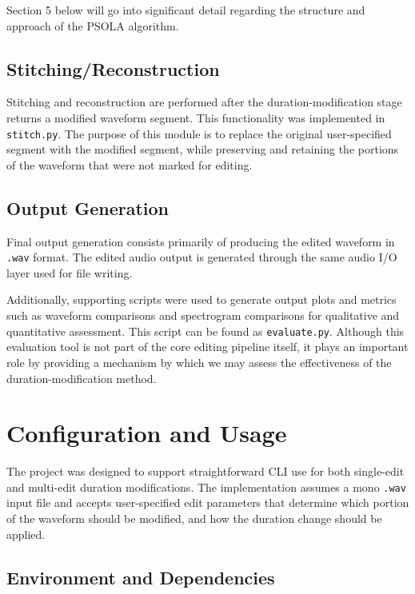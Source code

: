 \documentclass{article}
\begin{document}
Section 5 below will go into significant detail regarding the structure and approach of the PSOLA algorithm.

\subsection{Stitching/Reconstruction}

Stitching and reconstruction are performed after the duration-modification stage returns a modified waveform segment. This functionality was implemented in \texttt{stitch.py}. The purpose of this module is to replace the original user-specified segment with the modified segment, while preserving and retaining the portions of the waveform that were not marked for editing.

\subsection{Output Generation}

Final output generation consists primarily of producing the edited waveform in \texttt{.wav} format. The edited audio output is generated through the same audio I/O layer used for file writing.

Additionally, supporting scripts were used to generate output plots and metrics such as waveform comparisons and spectrogram comparisons for qualitative and quantitative assessment. This script can be found as \texttt{evaluate.py}. Although this evaluation tool is not part of the core editing pipeline itself, it plays an important role by providing a mechanism by which we may assess the effectiveness of the duration-modification method.

\section{Configuration and Usage}

The project was designed to support straightforward CLI use for both single-edit and multi-edit duration modifications. The implementation assumes a mono \texttt{.wav} input file and accepts user-specified edit parameters that determine which portion of the waveform should be modified, and how the duration change should be applied.

\subsection{Environment and Dependencies}
\end{document}
